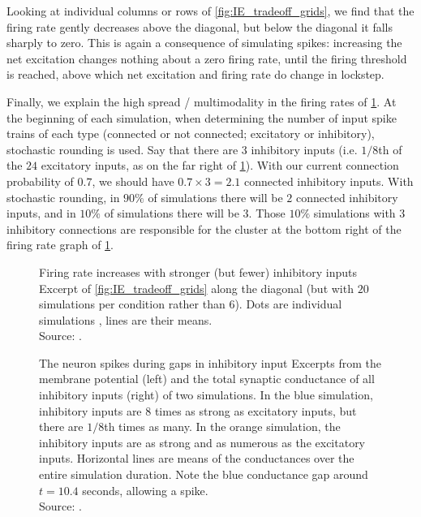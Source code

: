 Looking at individual columns or rows of \cref{fig:IE_tradeoff_grids}, we find that the firing rate gently decreases above the diagonal, but below the diagonal it falls sharply to zero. This is again a consequence of simulating spikes: increasing the net excitation changes nothing about a zero firing rate, until the firing threshold is reached, above which net excitation and firing rate do change in lockstep.

Finally, we explain the high spread / multimodality in the firing rates of \cref{fig:IE_tradeoff_diag}. At the beginning of each simulation, when determining the number of input spike trains of each type (connected or not connected; excitatory or inhibitory), stochastic rounding is used. Say that there are $3$ inhibitory inputs (i.e. $1/8$th of the $24$ excitatory inputs, as on the far right of \cref{fig:IE_tradeoff_diag}). With our current connection probability \pconn of $0.7$, we should have $0.7 \times 3 = 2.1$ connected inhibitory inputs. With stochastic rounding, in $90\%$ of simulations there will be $2$ connected inhibitory inputs, and in $10\%$ of simulations there will be $3$. Those $10\%$ simulations with $3$ inhibitory connections are responsible for the cluster at the bottom right of the firing rate graph of \cref{fig:IE_tradeoff_diag}.

\begin{figure}
    \hspace*{-2.5em}
  \captionn
  {Firing rate increases with stronger (but fewer) inhibitory inputs}
  {Excerpt of \cref{fig:IE_tradeoff_grids} along the diagonal (but with $20$ simulations per condition rather than $6$). Dots are individual simulations , lines are their means.\\
  Source: .}
  \label{fig:IE_tradeoff_diag}
\end{figure}

\begin{figure}
    \hspace*{-2.5em}
  \captionn
  {The neuron spikes during gaps in inhibitory input}
  {Excerpts from the membrane potential (left) and the total synaptic conductance of all inhibitory inputs (right) of two simulations. In the blue simulation, inhibitory inputs are $8$ times as strong as excitatory inputs, but there are $1/8$th times as many. In the orange simulation, the inhibitory inputs are as strong and as numerous as the excitatory inputs. Horizontal lines are means of the conductances over the entire simulation duration.
    Note the blue conductance gap around $t = 10.4$ seconds, allowing a spike.\\
    Source: .}
  \label{fig:IE_tradeoff_sigs}
\end{figure}





